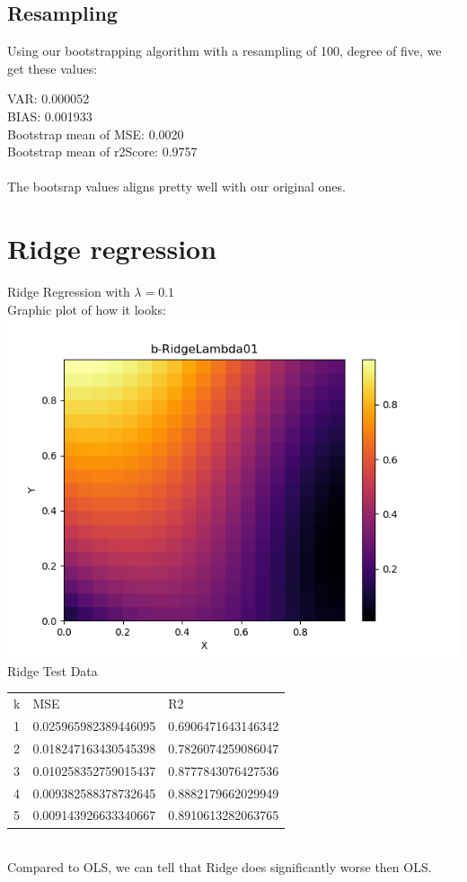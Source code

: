 \documentclass[a4paper,norsk]{article}
\begin{document}
\subsection*{Resampling}
Using our bootstrapping algorithm with a resampling of 100, degree of five, we get these values:

VAR: 0.000052
\\BIAS: 0.001933
\\Bootstrap mean of MSE: 0.0020
\\Bootstrap mean of r2Score: 0.9757
\\ 
\\The bootsrap values aligns pretty well with our original ones.
\clearpage
\section*{Ridge regression}
Ridge Regression with $\lambda = 0.1$
\\Graphic plot of how it looks:
\\ \includegraphics[scale=.7]{b-RidgeLambda01}
\\Ridge Test Data
\begin{table}[!h]
\begin{tabular}{lll}
k & MSE                   & R2                 \\
1 & 0.025965982389446095  & 0.6906471643146342 \\
2 & 0.018247163430545398  & 0.7826074259086047 \\
3 & 0.010258352759015437  & 0.8777843076427536 \\
4 & 0.009382588378732645  & 0.8882179662029949 \\
5 & 0.009143926633340667 & 0.8910613282063765
\end{tabular}
\end{table}
\\Compared to OLS, we can tell that Ridge does significantly worse then OLS.
\end{document}
